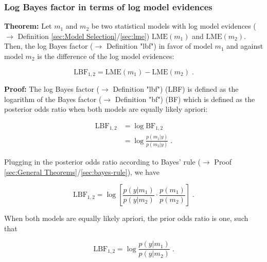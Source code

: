 \documentclass[a4paper,12pt]{book}
\begin{document}
\subsubsection[\textbf{Log Bayes factor in terms of log model evidences}]{Log Bayes factor in terms of log model evidences} \label{sec:lbf-lme}

\vspace{1em}
\textbf{Theorem:} Let $m_1$ and $m_2$ be two statistical models with log model evidences ($\rightarrow$ Definition \ref{sec:Model Selection}/\ref{sec:lme}) $\mathrm{LME}(m_1)$ and $\mathrm{LME}(m_2)$. Then, the log Bayes factor ($\rightarrow$ Definition "lbf") in favor of model $m_1$ and against model $m_2$ is the difference of the log model evidences:

\begin{equation} \label{eq:lbf-lme-LBF-LME}
\mathrm{LBF}_{1,2} = \mathrm{LME}(m_1) - \mathrm{LME}(m_2) \; .
\end{equation}


\vspace{1em}
\textbf{Proof:} The log Bayes factor ($\rightarrow$ Definition "lbf") (LBF) is defined as the logarithm of the Bayes factor ($\rightarrow$ Definition "bf") (BF) which is defined as the posterior odds ratio when both models are equally likely apriori:

\begin{equation} \label{eq:lbf-lme-LBF-s1}
\begin{split}
\mathrm{LBF}_{1,2} &= \log \mathrm{BF}_{1,2} \\
&= \log \frac{p(m_1|y)}{p(m_2|y)} \; .
\end{split}
\end{equation}

Plugging in the posterior odds ratio according to Bayes' rule ($\rightarrow$ Proof \ref{sec:General Theorems}/\ref{sec:bayes-rule}), we have

\begin{equation} \label{eq:lbf-lme-LBF-s2}
\mathrm{LBF}_{1,2} = \log \left[ \frac{p(y|m_1)}{p(y|m_2)} \cdot \frac{p(m_1)}{p(m_2)} \right] \; .
\end{equation}

When both models are equally likely apriori, the prior odds ratio is one, such that

\begin{equation} \label{eq:lbf-lme-LBF-s3}
\mathrm{LBF}_{1,2} = \log \frac{p(y|m_1)}{p(y|m_2)} \; .
\end{equation}
\end{document}
